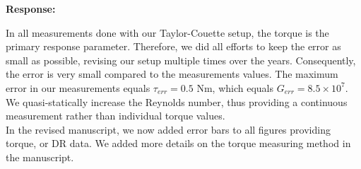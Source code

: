 \documentclass[10pt]{article}
\newcommand{\strong}[1]{\textbf{#1}}
\begin{document}
\noindent \strong{Response:} 

\noindent In all measurements done with our Taylor-Couette setup, the torque is the primary response parameter. Therefore, we did all efforts to keep the error as small as possible, revising our setup multiple times over the years. Consequently, the error is very small compared to the measurements values. The maximum error in our measurements equals $\tau_{err} = 0.5$ Nm, which equals $G_{err} = 8.5\times 10^7$. \\
We quasi-statically increase the Reynolds number, thus providing a continuous measurement rather than individual torque values. \\
In the revised manuscript, we now added error bars to all figures providing torque, or DR data. We added more details on the torque measuring method in the manuscript.




\end{document}
